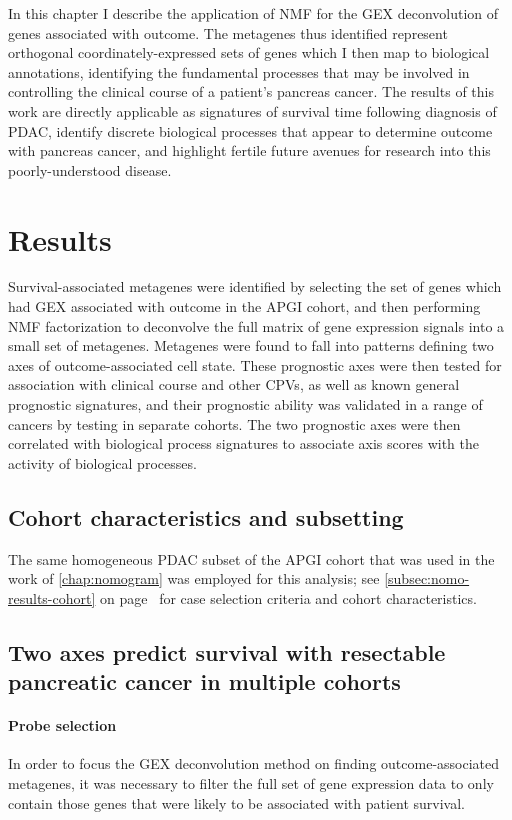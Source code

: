 \documentclass[dissertation.tex]{subfiles}
\begin{document}
In this chapter I describe the application of \gls{NMF} for the \gls{GEX} deconvolution of genes associated with outcome.  The metagenes thus identified represent orthogonal coordinately-expressed sets of genes which I then map to biological annotations, identifying the fundamental processes that may be involved in controlling the clinical course of a patient's pancreas cancer.  The results of this work are directly applicable as signatures of survival time following diagnosis of \gls{PDAC}, identify discrete biological processes that appear to determine outcome with pancreas cancer, and highlight fertile future avenues for research into this poorly-understood disease.


\section{Results}

Survival-associated metagenes were identified by selecting the set of genes which had \gls{GEX} associated with outcome in the \gls{APGI} cohort, and then performing \gls{NMF} factorization to deconvolve the full matrix of gene expression signals into a small set of metagenes.  Metagenes were found to fall into patterns defining two axes of outcome-associated cell state.  These prognostic axes were then tested for association with clinical course and other \glspl{CPV}, as well as known general prognostic signatures, and their prognostic ability was validated in a range of cancers by testing in separate cohorts.  The two prognostic axes were then correlated with biological process signatures to associate axis scores with the activity of biological processes.

\subsection{Cohort characteristics and subsetting}
The same homogeneous \gls{PDAC} subset of the \gls{APGI} cohort that was used in the work of \cref{chap:nomogram} was employed for this analysis; see \cref{subsec:nomo-results-cohort} on page~\pageref{subsec:nomo-results-cohort} for case selection criteria and cohort characteristics.

\subsection{Two axes predict survival with resectable pancreatic cancer in multiple cohorts}
\paragraph{Probe selection}
In order to focus the \gls{GEX} deconvolution method on finding outcome-associated metagenes, it was necessary to filter the full set of gene expression data to only contain those genes that were likely to be associated with patient survival.
\end{document}
